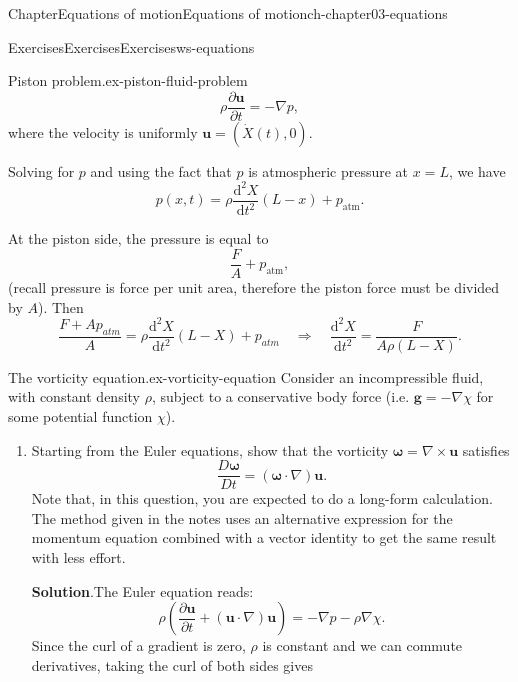 \documentclass[oneside,10pt,]{book}
\newcommand{\blocktitlefont}{\relax}
\numberwithin{equation}{section}
\newcommand{\de}{\mathrm{d}}
\newcommand{\dd}[2]{\frac{\de#1}{\de#2}}
\newcommand{\pd}[2]{\frac{\partial#1}{\partial#2}}
\newcommand{\bu}{\boldsymbol{u}}
\newcommand{\bg}{\boldsymbol{g}}
\newcommand{\bomega}{\boldsymbol{\omega}}
\begin{document}
\begin{chapterptx}{Chapter}{Equations of motion}{}{Equations of motion}{}{}{ch-chapter03-equations}
\begin{exercises-section}{Exercises}{Exercises}{}{Exercises}{}{}{ws-equations}
\begin{divisionexercise}{6}{Piston problem.}{}{ex-piston-fluid-problem}
\begin{equation*}
\rho\pd{\bu}{t}=-\nabla p,
\end{equation*}
where the velocity is uniformly \(\bu = (\dot{X}(t), 0)\).%
\par
Solving for \(p\) and using the fact that \(p\) is atmospheric pressure at \(x = L\), we have%
\begin{equation*}
p(x,t) = \rho\dd{^2 X}{t^2}(L-x)+p_\text{atm}.
\end{equation*}
%
\par
At the piston side, the pressure is equal to%
\begin{equation*}
\frac{F}{A} + p_\text{atm},
\end{equation*}
(recall pressure is force per unit area, therefore the piston force must be divided by \(A\)). Then%
\begin{equation*}
\frac{F+Ap_{atm}}{A} = \rho\dd{^2X}{t^2}(L-X)+p_{atm}
\quad\Rightarrow\quad
\dd{^2X}{t^2} = \frac{F}{A\rho(L-X)}.
\end{equation*}
%
\end{divisionexercise}%
\begin{divisionexercise}{7}{The vorticity equation.}{}{ex-vorticity-equation}%
Consider an incompressible fluid, with constant density \(\rho\), subject to a conservative body force (i.e. \({\bg} = -\nabla \chi\) for some potential function \(\chi\)).%
\begin{enumerate}[font=\bfseries,label=(\alph*),ref=\alph*]%
\item{}Starting from the Euler equations, show that the vorticity \(\bomega = \nabla \times {\bu}\) satisfies%
\begin{equation*}
\frac{D \bomega}{Dt} = (\bomega \cdot \nabla){\bu}.
\end{equation*}
Note that, in this question, you are expected to do a long-form calculation. The method given in the notes uses an alternative expression for the momentum equation combined with a vector identity to get the same result with less effort.%
\par\smallskip%
\noindent\textbf{\blocktitlefont Solution}.\hypertarget{ex-vorticity-equation-3-2}{}\quad{}The Euler equation reads:%
\begin{equation*}
\rho\left(\pd{\bu}{t} + (\bu \cdot \nabla)\bu\right) = -\nabla p - \rho\nabla \chi.
\end{equation*}
Since the curl of a gradient is zero, \(\rho\) is constant and we can commute derivatives, taking the curl of both sides gives%
\begin{equation*}

\end{equation*}
\end{enumerate}
\end{divisionexercise}
\end{exercises-section}
\end{chapterptx}
\end{document}
